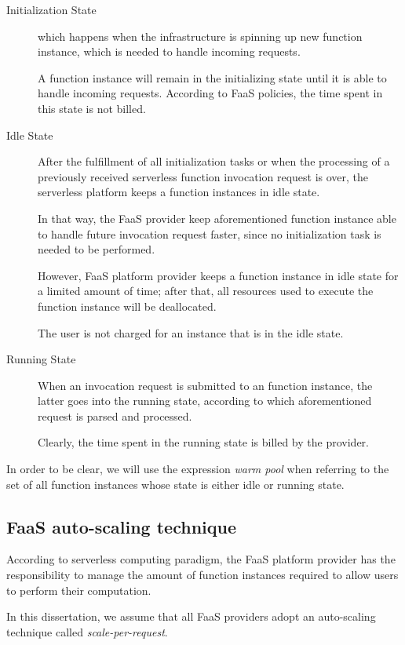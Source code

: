 \documentclass[12pt,a4paper]{report}
\theoremstyle{definition}
\begin{document}
\begin{description}
	
	\item[Initialization State] which happens when the infrastructure is spinning up new function instance, which is needed to handle incoming requests. 
	
	A function instance will remain in the initializing state until it is able to handle incoming requests. According to FaaS policies, the time spent in this state is not billed. 
	
	\item[Idle State] After the fulfillment of all initialization tasks or when the processing of a previously received serverless function invocation request is over, the serverless platform keeps a function instances in idle state.
	
	In that way, the FaaS provider keep aforementioned function instance able to handle future invocation request faster, since no initialization task is needed to be performed.
	
	However, FaaS platform provider keeps a function instance in idle state for a limited amount of time; after that, all resources used to execute the function instance will be deallocated.
	
	The user is not charged for an instance that is in the idle state.
	
	\item[Running State] When an invocation request is submitted to an function instance, the latter goes into the running state, according to which aforementioned request is parsed and processed.
	
	Clearly, the time spent in the running state is billed by the provider.
	
\end{description}

In order to be clear, we will use the expression \textit{warm pool} when referring to the set of all function instances whose state is either idle or running state.

\subsection{FaaS auto-scaling technique}

According to serverless computing paradigm, the FaaS platform provider has the responsibility to manage the amount of function instances required to allow users to perform their computation.

In this dissertation, we assume that all FaaS providers adopt an auto-scaling technique called \textit{scale-per-request}.
\end{document}
